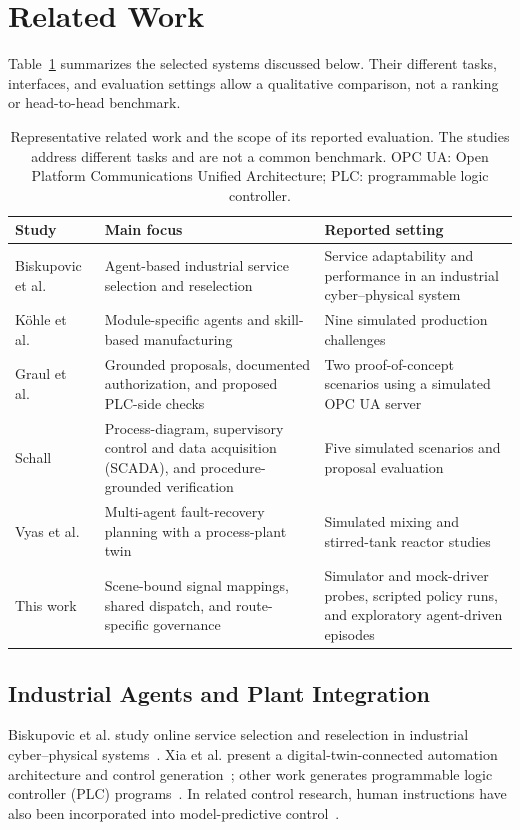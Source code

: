 \section{Related Work}
\label{sec:related}
Table~\ref{tab:related-comparison} summarizes the selected systems discussed below. Their different tasks, interfaces, and evaluation settings allow a qualitative comparison, not a ranking or head-to-head benchmark.

\begin{table}[!t]
\centering
\caption{Representative related work and the scope of its reported evaluation. The studies address different tasks and are not a common benchmark. OPC UA: Open Platform Communications Unified Architecture; PLC: programmable logic controller.}
\label{tab:related-comparison}
\footnotesize
\setlength{\tabcolsep}{5pt}
\begin{tabularx}{\textwidth}{@{}>{\raggedright\arraybackslash}p{}>{\raggedright\arraybackslash}p{}X@{}}
\toprule
Study & Main focus & Reported setting \\
\midrule
Biskupovic et al.~\cite{biskupovic2025supervision} & Agent-based industrial service selection and reselection & Service adaptability and performance in an industrial cyber--physical system \\
K\"{o}hle et al.~\cite{koehle2026llmdriven} & Module-specific agents and skill-based manufacturing & Nine simulated production challenges \\
Graul et al.~\cite{graul2026aas} & Grounded proposals, documented authorization, and proposed PLC-side checks & Two proof-of-concept scenarios using a simulated OPC UA server \\
Schall~\cite{schall2026safe} & Process-diagram, supervisory control and data acquisition (SCADA), and procedure-grounded verification & Five simulated scenarios and proposal evaluation \\
Vyas et al.~\cite{vyas2026detection} & Multi-agent fault-recovery planning with a process-plant twin & Simulated mixing and stirred-tank reactor studies \\
This work & Scene-bound signal mappings, shared dispatch, and route-specific governance & Simulator and mock-driver probes, scripted policy runs, and exploratory agent-driven episodes \\
\bottomrule
\end{tabularx}
\end{table}

\subsection{Industrial Agents and Plant Integration}
Biskupovic et al. study online service selection and reselection in industrial cyber--physical systems~\cite{biskupovic2025supervision}. Xia et al. present a digital-twin-connected automation architecture and control generation~\cite{xia2025architecture,xia2025control}; other work generates programmable logic controller (PLC) programs~\cite{liu2026agents4plc}. In related control research, human instructions have also been incorporated into model-predictive control~\cite{wu2025instructmpc}.

